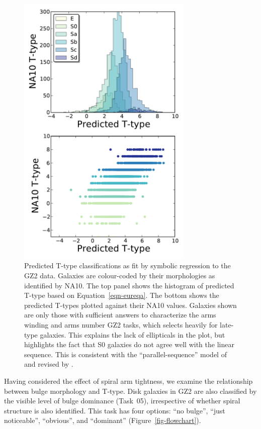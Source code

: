 \documentclass[useAMS,usenatbib]{mn2e}
\begin{document}
\begin{figure}
\includegraphics[angle=0,width=3.3in]{figures/eureqa.pdf}
\caption{Predicted T-type classifications as fit by symbolic regression to the GZ2 data. Galaxies are colour-coded by their morphologies as identified by NA10. The top panel shows the histogram of predicted T-type based on Equation~\ref{eqn-eureqa}. The bottom shows the predicted T-types plotted against their NA10 values. Galaxies shown are only those with sufficient answers to characterize the arms winding and arms number GZ2 tasks, which selects heavily for late-type galaxies. This explains the lack of ellipticals in the plot, but highlights the fact that S0 galaxies do not agree well with the linear sequence. This is consistent with the ``parallel-sequence'' model of \citet{van76} and revised by \citet{kor12}. 
\label{fig-eureqa}}
\end{figure}

Having considered the effect of spiral arm tightness, we examine the relationship between bulge morphology and T-type. Disk galaxies in GZ2 are also classified by the visible level of bulge dominance (Task~05), irrespective of whether spiral structure is also identified. This task has four options: ``no bulge'', ``just noticeable'', ``obvious'', and ``dominant'' (Figure~\ref{fig-flowchart}). 
\end{document}
